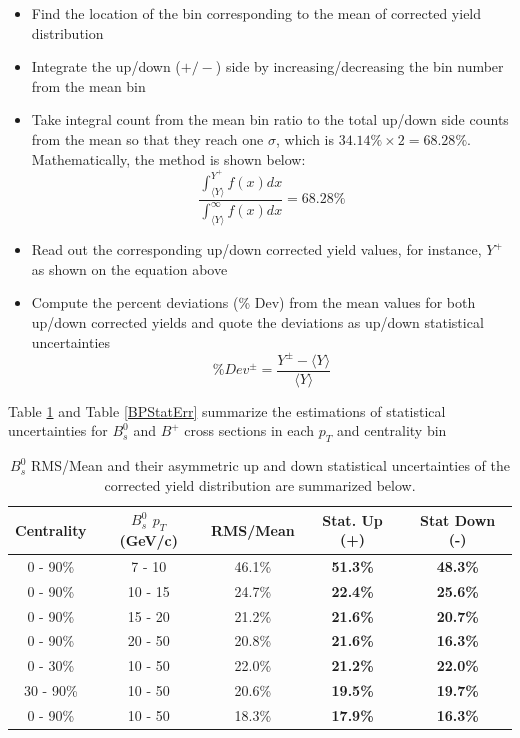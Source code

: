 \begin{itemize}
\item Find the location of the bin corresponding to the mean of corrected yield distribution 
\item Integrate the up/down ($+/-$) side by increasing/decreasing the bin number from the mean bin 
\item Take integral count from the mean bin ratio to the total up/down side counts from the mean so that they reach one $\sigma$, which is $34.14\% \times 2 = 68.28\%$. Mathematically, the method is shown below:
\begin{equation}
\frac{\int_{\langle Y \rangle}^{Y^+} f(x) dx }{\int_{\langle Y \rangle}^{\infty} f(x) dx} = 68.28\%
\end{equation}
\item Read out the corresponding up/down corrected yield values, for instance, $Y^+$ as shown on the equation above
\item Compute the percent deviations (\% Dev) from the mean values for both up/down corrected yields and quote the deviations as up/down statistical uncertainties 
\begin{equation}
\% Dev^\pm =\frac{Y^\pm - \langle Y \rangle}{\langle Y \rangle}
\end{equation}
\end{itemize}

Table \ref{BsStatErr} and Table \ref{BPStatErr} summarize the estimations of statistical uncertainties for $B^0_s$ and $B^+$ cross sections in each $p_T$ and centrality bin

\begin{table}[h]
\begin{center}
\caption{$B^0_s$ RMS/Mean and their asymmetric up and down statistical uncertainties of the corrected yield distribution are summarized below.}
\vspace{1em}
\label{BsStatErr}
  \begin{tabular}{| c | c |c | c| c|}
    \hline
     Centrality &  $B^0_s$ $p_T$ (GeV/c) & RMS/Mean  & Stat. Up (+) & Stat Down (-)  \\
    \hline
    \hline
0 - 90\% & 7 - 10 & 46.1\%  &  \textbf{51.3\% }  &  \textbf{48.3\% }   \\ 
0 - 90\% & 10 - 15 & 24.7\% & \textbf{22.4\% }  & \textbf{25.6\%}  \\ 
0 - 90\% & 15 - 20 & 21.2\% & \textbf{21.6\% }  & \textbf{20.7\%}   \\ 
0 - 90\% & 20 - 50 & 20.8\% & \textbf{21.6\% }  &  \textbf{16.3\%}   \\ 
0 - 30\% & 10 - 50 & 22.0\% &  \textbf{21.2\% }  &  \textbf{22.0\% } \\ 
30 - 90\% & 10 - 50 & 20.6\% & \textbf{19.5\% }  &  \textbf{19.7\% }  \\ 
0 - 90\% & 10 - 50 & 18.3\% & \textbf{17.9\% }  & \textbf{16.3\% }  \\ 
    \hline
    \hline
\end{tabular}
\end{center}
\end{table}


